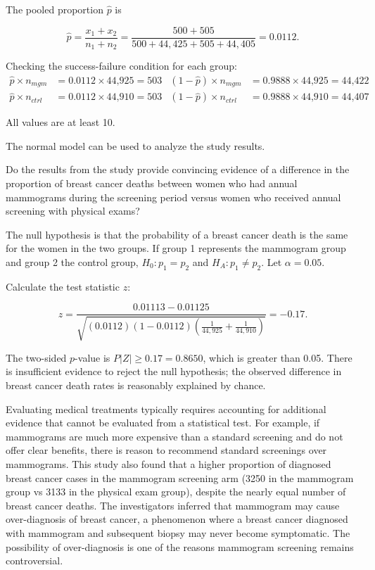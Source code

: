\begin{example}
The pooled proportion $\hat{p}$ is  

\[\hat{p} = \dfrac{x_{1} + x_{2}}{n_{1} + n_{2}} = \dfrac{500 + 505}{500 + 44,425 + 505 + 44,405} = 0.0112. \]

Checking the success-failure condition for each group: 
\begin{align*}
\hat{p} \times n_{mgm} &= 0.0112 \times \text{44,925} = 503
& (1 - \hat{p}) \times n_{mgm} &= 0.9888 \times \text{44,925} = \text{44,422} \\
\hat{p} \times n_{ctrl} &= 0.0112 \times \text{44,910} = 503
& (1 - \hat{p}) \times n_{ctrl} &= 0.9888 \times \text{44,910} = \text{44,407}
\end{align*}

All values are at least 10. 

The normal model can be used to analyze the study results.
\label{mammogramSuccessFailure}
\end{example}

\begin{example}{Do the results from the study provide convincing evidence of a difference in the proportion of breast cancer deaths between women who had annual mammograms during the screening period versus women who received annual screening with physical exams?}

\label{mammogramExProp}

The null hypothesis is that the probability of a breast cancer death is the same for the women in the two groups. If group 1 represents the mammogram group and group 2 the control group, $H_0: p_1 = p_2$ and $H_A: p_1 \neq p_2$.  Let $\alpha = 0.05$.

Calculate the test statistic $z$:

\[z = \dfrac{0.01113 - 0.01125}{\sqrt{(0.0112)(1-0.0112)\left(\frac{1}{44,925} + \frac{1}{44,910} \right)}} = -0.17.
\]	
	
The two-sided $p$-value is $P|Z| \ge 0.17 = 0.8650$,  which is greater than 0.05. There is insufficient evidence to reject the null hypothesis; the observed difference in breast cancer death rates is reasonably explained by chance. 	


Evaluating medical treatments typically requires accounting for additional evidence that cannot be evaluated from a statistical test. For example, if mammograms are much more expensive than a standard screening and do not offer clear benefits, there is reason to recommend standard screenings over mammograms. This study also found that a higher proportion of diagnosed breast cancer cases in the mammogram screening arm (3250 in the mammogram group vs 3133 in the physical exam group), despite the nearly equal number of breast cancer deaths.  The investigators inferred that mammogram may cause over-diagnosis of breast cancer, a phenomenon where a breast cancer diagnosed with mammogram and subsequent biopsy may never become symptomatic. The possibility of over-diagnosis is one of the reasons mammogram screening remains controversial.

\end{example}

